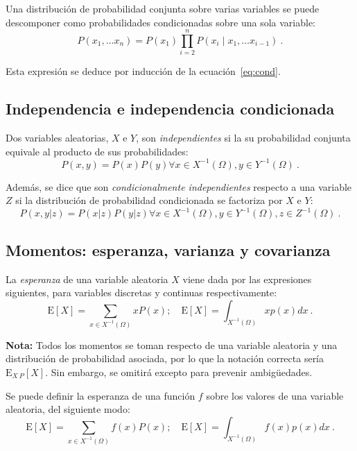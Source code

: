 
Una distribución de probabilidad conjunta sobre varias variables se
puede descomponer como probabilidades condicionadas sobre una sola
variable:
\[P(x_1, \dots x_n) = P(x_1)\prod\limits_{i=2}^n P(x_i\mid x_1, \dots x_{i-1})~.\]

Esta expresión se deduce por inducción de la ecuación~\eqref{eq:cond}.

\subsection{Independencia e independencia
condicionada}\label{independencia-e-independencia-condicionada}

Dos variables aleatorias, \(X\) e \(Y\), son \emph{independientes} si
la su probabilidad conjunta equivale al producto de sus probabilidades:
\[P(x,y)=P(x)P(y)\forall x\in X^{-1}(\Omega),y\in Y^{-1}(\Omega)~.\]

Además, se dice que son \emph{condicionalmente independientes}
respecto a una variable \(Z\) si la distribución de probabilidad
condicionada se factoriza por \(X\) e \(Y\):
\[P(x,y|z)=P(x|z)P(y|z)\forall x\in X^{-1}(\Omega),y\in Y^{-1}(\Omega),z\in Z^{-1}(\Omega)~.\]

\subsection{Momentos: esperanza, varianza y
covarianza}\label{momentos-esperanza-varianza-y-covarianza}

La \emph{esperanza} de una variable aleatoria \(X\) viene dada por las
expresiones siguientes, para variables discretas y continuas
respectivamente:
\[\mathrm E[X]=\sum_{x\in X^{-1}(\Omega)}xP(x);\quad \mathrm E[X]=\int_{X^{-1}(\Omega)}xp(x)dx~.\]

\textbf{Nota:} Todos los momentos se toman respecto de una variable
aleatoria y una distribución de probabilidad asociada, por lo que la
notación correcta sería \(\mathrm E_{X~P}[X]\). Sin embargo, se omitirá
excepto para prevenir ambigüedades.

Se puede definir la esperanza de una función \(f\) sobre los valores de
una variable aleatoria, del siguiente modo:
\[\mathrm E[X]=\sum_{x\in X^{-1}(\Omega)}f(x)P(x);\quad \mathrm E[X]=\int_{X^{-1}(\Omega)}f(x)p(x)dx~.\]

